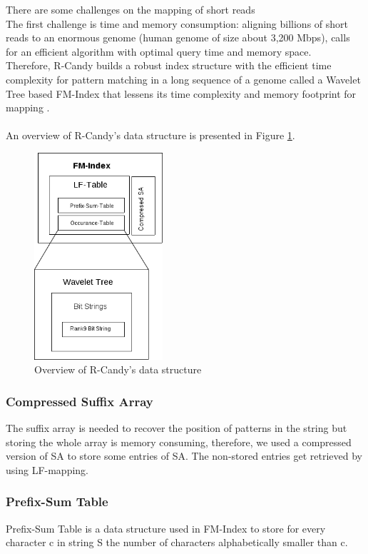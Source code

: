 \documentclass[11pt,a4paper]{report}
\begin{document}
There are some challenges on the mapping of short reads\\
The first challenge is time and memory consumption: aligning billions of short
reads to an enormous genome (human genome of size about 3,200 Mbps), 
calls for an efficient algorithm with optimal query time and memory space.\\
Therefore, R-Candy builds a robust index structure with 
the efficient time complexity for pattern matching in a long sequence of a genome
called a Wavelet Tree based FM-Index that lessens its time complexity and memory footprint for mapping . 
\\\\
An overview of R-Candy's data structure is presented in Figure \ref{DSOverview}\cite{Wavthesis}.\\

\begin{figure}[H]
\centering
\includegraphics[width=4.75cm]{pictures/DSOverview2.png}
\caption{Overview of R-Candy's data structure }
\label{DSOverview}
\end{figure}


\subsubsection{Compressed Suffix Array}
The suffix array is needed to recover the position of patterns in the string
but storing the whole array is memory consuming, therefore, we used a
compressed version of SA to store some entries of SA.
The non-stored entries get retrieved by using LF-mapping.

\subsubsection{Prefix-Sum Table}
Prefix-Sum Table is a data structure used in FM-Index to store for every character c in string S the number of characters alphabetically smaller than c.
\end{document}
